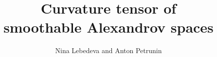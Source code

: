 \documentclass[a4paper,10pt]{article}
\begin{document}
\title{Curvature tensor of\\ smoothable Alexandrov spaces}
\author{Nina Lebedeva and Anton Petrunin}
\maketitle










{\sloppy
\printbibliography[heading=bibintoc]
\fussy
}
\end{document}
